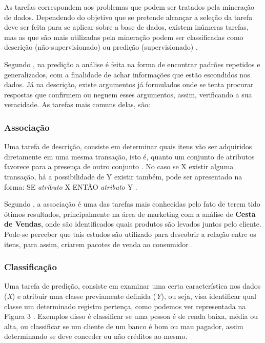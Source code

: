\par

As tarefas correspondem aos problemas que podem ser tratados pela mineração de dados. Dependendo do objetivo que se pretende alcançar a seleção da tarefa deve ser feita para se aplicar sobre a base de dados, existem inúmeras tarefas, mas as que são mais utilizadas pela mineração podem ser classificadas como descrição (não-supervisionado) ou predição (supervisionado) \cite{Garcia2013, Camilo2009}.

\par
Segundo , na predição a análise é feita na forma de encontrar padrões repetidos e generalizados, com a finalidade de achar informações que estão escondidos nos dados. Já na descrição, existe argumentos já formulados onde se tenta procurar respostas que confirmem ou neguem esses argumentos, assim, verificando a sua veracidade. As tarefas mais comuns delas, são: 


\subsubsection{Associação}

\par
Uma tarefa de descrição, consiste em determinar quais itens vão ser adquiridos diretamente em uma mesma transação, isto é, quanto um conjunto de atributos favorece para a presença de outro conjunto \cite{Garcia2013}. No caso se X existir alguma transação, há a possibilidade de Y existir também, pode ser apresentado na forma: SE \textit{atributo} X ENTÃO \textit{atributo} Y \cite{Camilo2009}. 

\par
Segundo , a associação é uma das tarefas mais conhecidas pelo fato de terem tido ótimos resultados, principalmente na área de marketing com a análise de \textbf{Cesta de Vendas}, onde são identificados quais produtos são levados juntos pelo cliente. Pode-se perceber que tais estudos são utilizado para descobrir a relação entre os itens, para assim, criarem pacotes de venda ao consumidor \cite{Garcia2013}. 


\subsubsection{Classificação}

\par
Uma tarefa de predição, consiste em examinar uma certa característica nos dados (\textit{X}) e atribuir uma classe previamente definida (\textit{Y}), ou seja, visa identificar qual classe um determinado registro pertença, como podemos ver representada na Figura 3 \cite{Garcia2013, Kampff2013}. Exemplos disso é classificar se uma pessoa é de renda baixa, média ou alta, ou classificar se um cliente de um banco é bom ou mau pagador, assim determinando se deve conceder ou não créditos ao mesmo.

